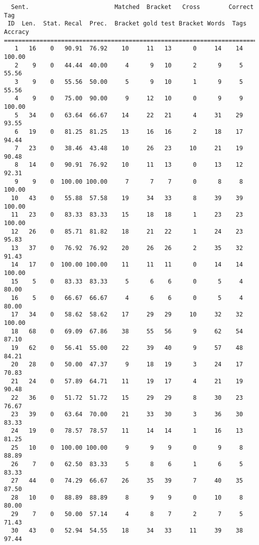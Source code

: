 \scriptsize
\begin{verbatim}
  Sent.                        Matched  Bracket   Cross        Correct Tag
 ID  Len.  Stat. Recal  Prec.  Bracket gold test Bracket Words  Tags Accracy
============================================================================
   1   16    0   90.91  76.92    10     11   13      0     14    14   100.00
   2    9    0   44.44  40.00     4      9   10      2      9     5    55.56
   3    9    0   55.56  50.00     5      9   10      1      9     5    55.56
   4    9    0   75.00  90.00     9     12   10      0      9     9   100.00
   5   34    0   63.64  66.67    14     22   21      4     31    29    93.55
   6   19    0   81.25  81.25    13     16   16      2     18    17    94.44
   7   23    0   38.46  43.48    10     26   23     10     21    19    90.48
   8   14    0   90.91  76.92    10     11   13      0     13    12    92.31
   9    9    0  100.00 100.00     7      7    7      0      8     8   100.00
  10   43    0   55.88  57.58    19     34   33      8     39    39   100.00
  11   23    0   83.33  83.33    15     18   18      1     23    23   100.00
  12   26    0   85.71  81.82    18     21   22      1     24    23    95.83
  13   37    0   76.92  76.92    20     26   26      2     35    32    91.43
  14   17    0  100.00 100.00    11     11   11      0     14    14   100.00
  15    5    0   83.33  83.33     5      6    6      0      5     4    80.00
  16    5    0   66.67  66.67     4      6    6      0      5     4    80.00
  17   34    0   58.62  58.62    17     29   29     10     32    32   100.00
  18   68    0   69.09  67.86    38     55   56      9     62    54    87.10
  19   62    0   56.41  55.00    22     39   40      9     57    48    84.21
  20   28    0   50.00  47.37     9     18   19      3     24    17    70.83
  21   24    0   57.89  64.71    11     19   17      4     21    19    90.48
  22   36    0   51.72  51.72    15     29   29      8     30    23    76.67
  23   39    0   63.64  70.00    21     33   30      3     36    30    83.33
  24   19    0   78.57  78.57    11     14   14      1     16    13    81.25
  25   10    0  100.00 100.00     9      9    9      0      9     8    88.89
  26    7    0   62.50  83.33     5      8    6      1      6     5    83.33
  27   44    0   74.29  66.67    26     35   39      7     40    35    87.50
  28   10    0   88.89  88.89     8      9    9      0     10     8    80.00
  29    7    0   50.00  57.14     4      8    7      2      7     5    71.43
  30   43    0   52.94  54.55    18     34   33     11     39    38    97.44

\end{verbatim}
